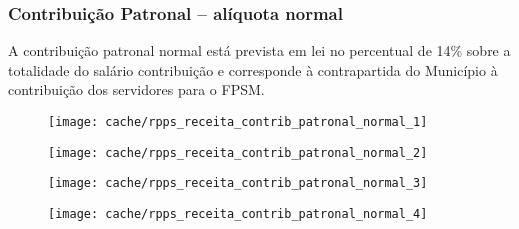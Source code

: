 
\subsubsection[Contribuição Patronal Normal]{Contribuição Patronal – alíquota normal}

A contribuição patronal normal está prevista em lei no percentual de 14\% sobre a totalidade do salário contribuição e corresponde à contrapartida do Município à contribuição dos servidores para o FPSM.





\begin{figure}[H]
\center
\texttt{[image: cache/rpps\_receita\_contrib\_patronal\_normal\_1]}
\end{figure}

\begin{figure}[H]
\center
\texttt{[image: cache/rpps\_receita\_contrib\_patronal\_normal\_2]}
\end{figure}

\begin{figure}[H]
\center
\texttt{[image: cache/rpps\_receita\_contrib\_patronal\_normal\_3]}
\end{figure}

\begin{figure}[H]
\center
\texttt{[image: cache/rpps\_receita\_contrib\_patronal\_normal\_4]}
\end{figure}